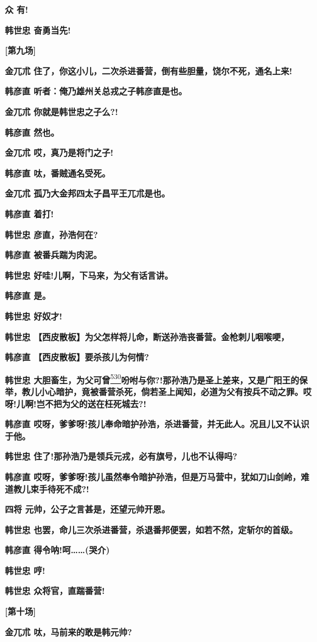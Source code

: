 \textbf{众 有!}

\textbf{韩世忠 奋勇当先!}

\textbf{{[}第九场{]}}

\textbf{金兀朮
住了，你这小儿，二次杀进番营，倒有些胆量，饶尔不死，通名上来!}

\textbf{韩彦直 听者：俺乃雄州关总戎之子韩彦直是也。}

\textbf{金兀朮 你就是韩世忠之子么?!}

\textbf{韩彦直 然也。}

\textbf{金兀朮 哎，真乃是将门之子!}

\textbf{韩彦直 呔，番贼通名受死。}

\textbf{金兀朮 孤乃大金邦四太子昌平王兀朮是也。}

\textbf{韩彦直 着打!}

\textbf{韩世忠 彦直，孙浩何在?}

\textbf{韩彦直 被番兵踹为肉泥。}

\textbf{韩世忠 好哇!儿啊，下马来，为父有话言讲。}

\textbf{韩彦直 是。}

\textbf{韩世忠 好奴才!}

\textbf{韩世忠
【西皮散板】为父怎样将儿命，断送孙浩丧番营。金枪刺儿咽喉哽，}

\textbf{韩彦直 【西皮散板】要杀孩儿为何情?}

\textbf{韩世忠
大胆畜生，为父可曾}\protect\hyperlink{fn530}{\textsuperscript{530}}\textbf{吩咐与你?!那孙浩乃是圣上差来，又是广阳王的保举，教儿小心暗护，竟被番营杀死，倘若圣上闻知，必道为父有按兵不动之罪。哎呀!儿啊!岂不把为父的送在枉死城去?!}

\textbf{韩彦直
哎呀，爹爹呀!孩儿奉命暗护孙浩，杀进番营，并无此人。况且儿又不认识于他。}

\textbf{韩世忠 住了!那孙浩乃是领兵元戎，必有旗号，儿也不认得吗?}

\textbf{韩彦直
哎呀，爹爹呀!孩儿虽然奉令暗护孙浩，但是万马营中，犹如刀山剑岭，难道教儿束手待死不成?!}

\textbf{四将 元帅，公子之言甚是，还望元帅开恩。}

\textbf{韩世忠
也罢，命儿三次杀进番营，杀退番邦便罢，如若不然，定斩尔的首级。}

\textbf{韩彦直 得令呐!呵\ldots{}\ldots{}(哭介)}

\textbf{韩世忠 哼!}

\textbf{韩世忠 众将官，直踹番营!}

\textbf{{[}第十场{]}}

\textbf{金兀朮 呔，马前来的敢是韩元帅?}

